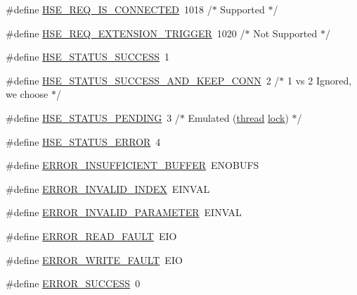 \begin{DoxyCompactItemize}
\item 
\#define \hyperlink{group__MOD__ISAPI_gac04fd2456fe6ec3721f69c0d23775820}{H\+S\+E\+\_\+\+R\+E\+Q\+\_\+\+I\+S\+\_\+\+C\+O\+N\+N\+E\+C\+T\+ED}~1018 /$\ast$ Supported $\ast$/
\item 
\#define \hyperlink{group__MOD__ISAPI_gad2a79a988367d44cb20e1d21369532e5}{H\+S\+E\+\_\+\+R\+E\+Q\+\_\+\+E\+X\+T\+E\+N\+S\+I\+O\+N\+\_\+\+T\+R\+I\+G\+G\+ER}~1020 /$\ast$ Not Supported $\ast$/
\item 
\#define \hyperlink{group__MOD__ISAPI_ga93dc040be5271de7b375f297801ea0c0}{H\+S\+E\+\_\+\+S\+T\+A\+T\+U\+S\+\_\+\+S\+U\+C\+C\+E\+SS}~1
\item 
\#define \hyperlink{group__MOD__ISAPI_gac98fd67291e58537218d42ea5f1fe51d}{H\+S\+E\+\_\+\+S\+T\+A\+T\+U\+S\+\_\+\+S\+U\+C\+C\+E\+S\+S\+\_\+\+A\+N\+D\+\_\+\+K\+E\+E\+P\+\_\+\+C\+O\+NN}~2 /$\ast$ 1 vs 2 Ignored, we choose $\ast$/
\item 
\#define \hyperlink{group__MOD__ISAPI_ga26f54a6deb77731e4b4176a20c168e15}{H\+S\+E\+\_\+\+S\+T\+A\+T\+U\+S\+\_\+\+P\+E\+N\+D\+I\+NG}~3 /$\ast$ Emulated (\hyperlink{group__apr__thread__proc_ga188dd007cf9d8f4d1f258aaf0bc2c2c9}{thread} \hyperlink{group__APR__Util__RMM_ga0353fe7d0bd33c38d9a7a57a73b6407e}{lock}) $\ast$/
\item 
\#define \hyperlink{group__MOD__ISAPI_gac55126cc1cb624b22b81972f11c10af7}{H\+S\+E\+\_\+\+S\+T\+A\+T\+U\+S\+\_\+\+E\+R\+R\+OR}~4
\item 
\#define \hyperlink{group__MOD__ISAPI_ga9ea4797ca694b9d2dfe6b408dfee69c1}{E\+R\+R\+O\+R\+\_\+\+I\+N\+S\+U\+F\+F\+I\+C\+I\+E\+N\+T\+\_\+\+B\+U\+F\+F\+ER}~E\+N\+O\+B\+U\+FS
\item 
\#define \hyperlink{group__MOD__ISAPI_ga58c955beed612b69016bb6ce5d0793e6}{E\+R\+R\+O\+R\+\_\+\+I\+N\+V\+A\+L\+I\+D\+\_\+\+I\+N\+D\+EX}~E\+I\+N\+V\+AL
\item 
\#define \hyperlink{group__MOD__ISAPI_ga176960f93d11db6f58d10a6957a80f38}{E\+R\+R\+O\+R\+\_\+\+I\+N\+V\+A\+L\+I\+D\+\_\+\+P\+A\+R\+A\+M\+E\+T\+ER}~E\+I\+N\+V\+AL
\item 
\#define \hyperlink{group__MOD__ISAPI_gaa95b08aade5d6b75da473958212f26ab}{E\+R\+R\+O\+R\+\_\+\+R\+E\+A\+D\+\_\+\+F\+A\+U\+LT}~E\+IO
\item 
\#define \hyperlink{group__MOD__ISAPI_ga3a0629584fa51398d070049a8b5c3c6f}{E\+R\+R\+O\+R\+\_\+\+W\+R\+I\+T\+E\+\_\+\+F\+A\+U\+LT}~E\+IO
\item 
\#define \hyperlink{group__MOD__ISAPI_gaea0ae801b7d25c979655a7eb20d034af}{E\+R\+R\+O\+R\+\_\+\+S\+U\+C\+C\+E\+SS}~0
\item 

\end{DoxyCompactItemize}
